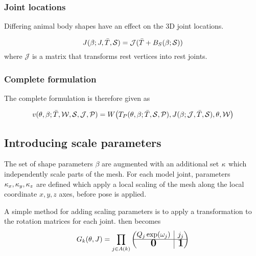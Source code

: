 \subsubsection{Joint locations}

Differing animal body shapes have an effect on the 3D joint locations. 

\begin{equation}
    J(\beta; J, \bar{T}, \mathcal{S}) = \mathcal{J}(\bar{T} + B_{S}(\beta; \mathcal{S}))
\end{equation}
where $\mathcal{J}$ is a matrix that transforms rest vertices into rest joints.

\subsubsection{Complete formulation}

The complete formulation is therefore given as

\begin{equation}
    v(\theta,\beta;\bar{T},\mathcal{W},\mathcal{S},\mathcal{J},\mathcal{P}) = W\big(T_{P}(\theta,\beta; \bar{T},\mathcal{S},\mathcal{P}), J(\beta; \mathcal{J}, \bar{T}, \mathcal{S}), \theta, \mathcal{W}\big)
\end{equation}


\subsection{Introducing scale parameters}

The set of shape parameters $\beta$ are augmented with an additional set $\kappa$ which independently scale parts of the mesh. For each model joint, parameters ${\kappa_x,\kappa_y,\kappa_z}$ are defined which apply a local scaling of the mesh along the local coordinate $x, y, z$ axes, before pose is applied. 

A simple method for adding scaling parameters is to apply a transformation to the rotation matrices for each joint.  then becomes
\begin{equation}
    G_{k}(\pose,\smalrestJ) = \prod_{j \in A(k)} 
    \begin{pmatrix}
        Q_{j} \exp(\poseele{j})
        & \rvline 
        & j_{j} \\
    \hline
        \bigzero
        & \rvline 
        & \bigone
    \end{pmatrix}
\end{equation}

